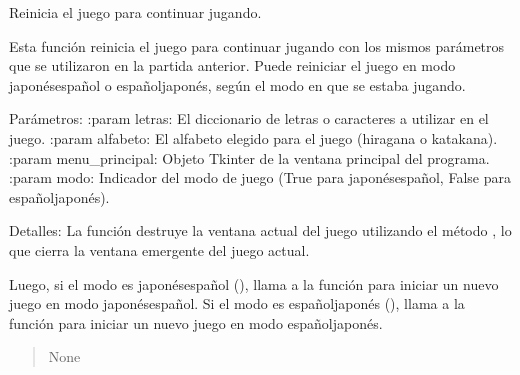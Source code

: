 \documentclass[letterpaper,10pt,spanish]{sphinxmanual}
\begin{document}
\begin{fulllineitems}
\begin{fulllineitems}
\begin{quote}
\begin{description}
\end{description}\end{quote}

\end{fulllineitems}


\begin{fulllineitems}
\label{\detokenize{juego:juego.Juego.repetir_si}}
\pysigstartsignatures
{}
\pysigstopsignatures
\sphinxAtStartPar
Reinicia el juego para continuar jugando.

\sphinxAtStartPar
Esta función reinicia el juego para continuar jugando con los mismos parámetros que
se utilizaron en la partida anterior. Puede reiniciar el juego en modo japonés\sphinxhyphen{}español
o español\sphinxhyphen{}japonés, según el modo en que se estaba jugando.

\sphinxAtStartPar
Parámetros:
:param letras: El diccionario de letras o caracteres a utilizar en el juego.
:param alfabeto: El alfabeto elegido para el juego (hiragana o katakana).
:param menu\_principal: Objeto Tkinter de la ventana principal del programa.
:param modo: Indicador del modo de juego (True para japonés\sphinxhyphen{}español, False para español\sphinxhyphen{}japonés).

\sphinxAtStartPar
Detalles:
La función destruye la ventana actual del juego utilizando el método , lo que
cierra la ventana emergente del juego actual.

\sphinxAtStartPar
Luego, si el modo es japonés\sphinxhyphen{}español (), llama a la función  para
iniciar un nuevo juego en modo japonés\sphinxhyphen{}español. Si el modo es español\sphinxhyphen{}japonés (),
llama a la función  para iniciar un nuevo juego en modo español\sphinxhyphen{}japonés.
\begin{quote}\begin{description}
\sphinxAtStartPar
None

\end{description}\end{quote}

\end{fulllineitems}


\end{fulllineitems}
\end{document}
